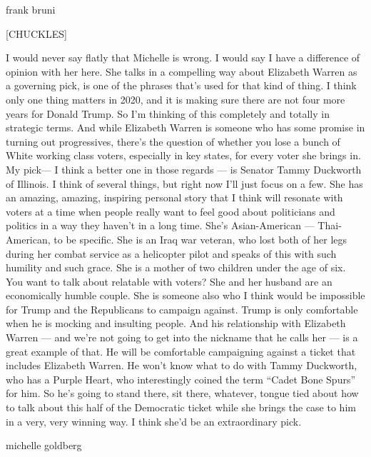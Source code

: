 frank bruni

{[}CHUCKLES{]}

I would never say flatly that Michelle is wrong. I would say I have a
difference of opinion with her here. She talks in a compelling way about
Elizabeth Warren as a governing pick, is one of the phrases that's used
for that kind of thing. I think only one thing matters in 2020, and it
is making sure there are not four more years for Donald Trump. So I'm
thinking of this completely and totally in strategic terms. And while
Elizabeth Warren is someone who has some promise in turning out
progressives, there's the question of whether you lose a bunch of White
working class voters, especially in key states, for every voter she
brings in. My pick--- I think a better one in those regards --- is
Senator Tammy Duckworth of Illinois. I think of several things, but
right now I'll just focus on a few. She has an amazing, amazing,
inspiring personal story that I think will resonate with voters at a
time when people really want to feel good about politicians and politics
in a way they haven't in a long time. She's Asian-American ---
Thai-American, to be specific. She is an Iraq war veteran, who lost both
of her legs during her combat service as a helicopter pilot and speaks
of this with such humility and such grace. She is a mother of two
children under the age of six. You want to talk about relatable with
voters? She and her husband are an economically humble couple. She is
someone also who I think would be impossible for Trump and the
Republicans to campaign against. Trump is only comfortable when he is
mocking and insulting people. And his relationship with Elizabeth Warren
--- and we're not going to get into the nickname that he calls her ---
is a great example of that. He will be comfortable campaigning against a
ticket that includes Elizabeth Warren. He won't know what to do with
Tammy Duckworth, who has a Purple Heart, who interestingly coined the
term ``Cadet Bone Spurs'' for him. So he's going to stand there, sit
there, whatever, tongue tied about how to talk about this half of the
Democratic ticket while she brings the case to him in a very, very
winning way. I think she'd be an extraordinary pick.

michelle goldberg


